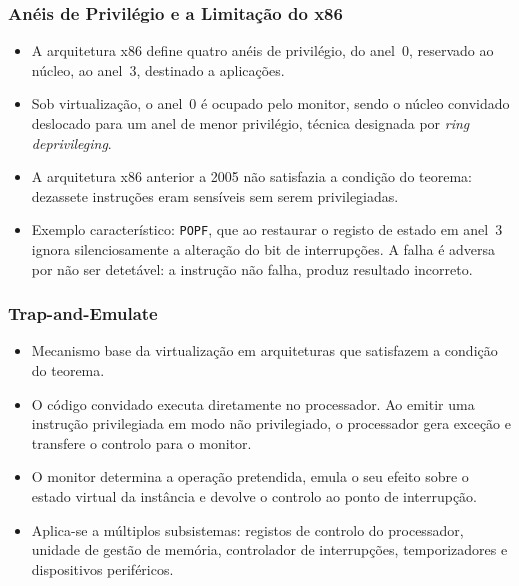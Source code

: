 \documentclass[aspectratio=169]{beamer}
\begin{document}
\begin{frame}
\frametitle{Anéis de Privilégio e a Limitação do x86}
\begin{itemize}
    \setlength\itemsep{0.35cm}
    \item A arquitetura x86 define quatro anéis de privilégio, do anel~0, reservado ao núcleo, ao anel~3, destinado a aplicações.
    \item Sob virtualização, o anel~0 é ocupado pelo monitor, sendo o núcleo convidado deslocado para um anel de menor privilégio, técnica designada por \emph{ring deprivileging}.
    \item A arquitetura x86 anterior a 2005 não satisfazia a condição do teorema: dezassete instruções eram sensíveis sem serem privilegiadas.
    \item Exemplo característico: \texttt{POPF}, que ao restaurar o registo de estado em anel~3 ignora silenciosamente a alteração do bit de interrupções. A falha é adversa por não ser detetável: a instrução não falha, produz resultado incorreto.
\end{itemize}
\end{frame}

\begin{frame}
\frametitle{Trap-and-Emulate}
\begin{itemize}
    \setlength\itemsep{0.4cm}
    \item Mecanismo base da virtualização em arquiteturas que satisfazem a condição do teorema.
    \item O código convidado executa diretamente no processador. Ao emitir uma instrução privilegiada em modo não privilegiado, o processador gera exceção e transfere o controlo para o monitor.
    \item O monitor determina a operação pretendida, emula o seu efeito sobre o estado virtual da instância e devolve o controlo ao ponto de interrupção.
    \item Aplica-se a múltiplos subsistemas: registos de controlo do processador, unidade de gestão de memória, controlador de interrupções, temporizadores e dispositivos periféricos.
\end{itemize}
\end{frame}
\end{document}
